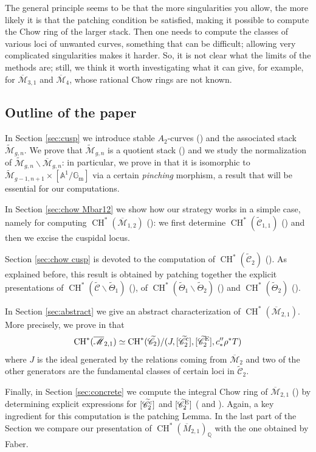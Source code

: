 \documentclass[a4paper, 10pt]{amsart}
\numberwithin{equation}{section}
\numberwithin{subsection}{section}
\theoremstyle{definition}
\theoremstyle{remark}
\renewcommand{\mathcal}{\mathscr}
\newcommand\cM{\mathcal{M}} \newcommand\cN{\mathcal{N}}
\renewcommand\AA{\mathbb{A}} \newcommand\BB{\mathbb{B}}
\newcommand\GG{\mathbb{G}} \newcommand\HH{\mathbb{H}}
\newcommand\rmm{\mathrm{m}} \newcommand\rmn{\mathrm{n}}
\newcommand{\gm}{\GG_{\rmm}}
\newcommand{\Mbar}{\overline{\cM}}
\newcommand{\Mtilde}{\widetilde{\mathcal M}}
\newcommand{\Ctilde}{\widetilde{\mathcal C}}
\newcommand{\ThTilde}{\widetilde{\Theta}}
\newcommand{\ag}{[\AA^{1}/\gm]}
\newcommand{\ch}[1][*]{\operatorname{CH}^{#1}}
\begin{document}
The general principle seems to be that the more singularities you allow, the more likely it is that the patching condition be satisfied, making it possible to compute the Chow ring of the larger stack. Then one needs to compute the classes of various loci of unwanted curves, something that can be difficult; allowing very complicated singularities makes it harder. So, it is not clear what the limits of the methods are; still, we think it worth investigating what it can give, for example, for $\Mbar_{3,1}$ and $\Mbar_{4}$, whose rational Chow rings are not known.

	
	\subsection*{Outline of the paper}
	In Section \ref{sec:cusp} we introduce stable $A_2$-curves () and the associated stack $\Mtilde_{g,n}$. We prove that $\Mtilde_{g,n}$ is a quotient stack () and we study the normalization of $\Mtilde_{g,n}\smallsetminus\Mbar_{g,n}$: in particular, we prove in  that it is isomorphic to $\Mtilde_{g-1,n+1}\times\ag$ via a certain \emph{pinching} morphism, a result that will be essential for our computations.
	
	In Section \ref{sec:chow Mbar12} we show how our strategy works in a simple case, namely for computing $\ch(\Mbar_{1,2})$ (): we first determine $\ch(\Ctilde_{1,1})$ () and then we excise the cuspidal locus.
	
	Section \ref{sec:chow cusp} is devoted to the computation of $\ch(\Ctilde_2)$ (). As explained before, this result is obtained by patching together the explicit presentations of $\ch(\Ctilde\smallsetminus\ThTilde_1)$ (), of $\ch(\ThTilde_1\smallsetminus\ThTilde_2)$ () and $\ch(\ThTilde_2)$ ().
	
	In Section \ref{sec:abstract} we give an abstract characterization of $\ch(\Mbar_{2,1})$. More precisely, we prove in  that
	\[\ch(\Mbar_{2,1})\simeq\ch(\Ctilde_2)/(J,[\Ctilde_2^{\rm c}],[\Ctilde_2^{\rm E}],c''_*\rho^*T) \]
	where $J$ is the ideal generated by the relations coming from $\Mbar_2$ and two of the other generators are the fundamental classes of certain loci in $\Ctilde_2$.
	
	Finally, in Section \ref{sec:concrete} we compute the integral Chow ring of $\Mbar_{2,1}$ () by determining explicit expressions for $[\Ctilde_2^{\rm c}]$ and $[\Ctilde_2^{\rm E}]$ ( and ). Again, a key ingredient for this computation is the patching Lemma. In the last part of the Section we compare our presentation of $\ch(\overline{M}_{2,1})_{\mathbb{Q}}$ with the one obtained by Faber.
	
\end{document}
